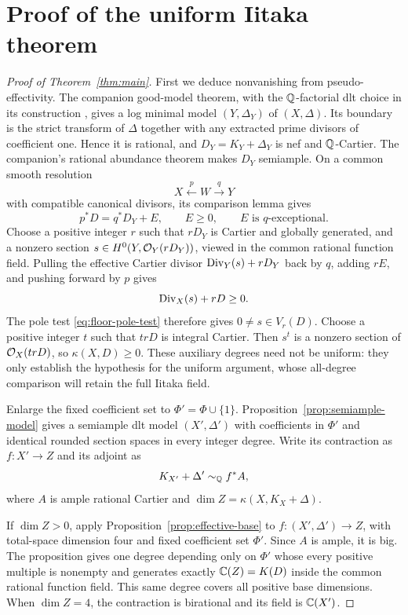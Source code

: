 \section{Proof of the uniform Iitaka theorem}
\label{sec:main-proof}

\begin{proof}[Proof of Theorem~\ref{thm:main}]
First we deduce nonvanishing from pseudo-effectivity. The companion
good-model theorem, with the \(\mathbb Q\)-factorial dlt choice in its
construction \cite[Theorem~11.1 and Proposition~2.5]{OpenAIAbundance},
gives a log minimal model \((Y,\Delta_Y)\) of \((X,\Delta)\).
Its boundary is the strict transform of \(\Delta\) together with any
extracted prime divisors of coefficient one. Hence it is rational,
and \(D_Y=K_Y+\Delta_Y\) is nef and \(\mathbb Q\)-Cartier. The companion's
rational abundance theorem \cite[Theorem~1.1]{OpenAIAbundance} makes
\(D_Y\) semiample. On a common smooth resolution
\[
 X\xleftarrow{p}W\xrightarrow{q}Y
\]
with compatible canonical divisors, its comparison lemma
\cite[Lemma~2.2]{OpenAIAbundance} gives
\[
 p^*D=q^*D_Y+E,\qquad E\geq0,\qquad E\text{ is }q\text{-exceptional}.
\]
Choose a positive integer \(r\) such that \(rD_Y\) is Cartier and
globally generated, and a nonzero section
\(s\in H^0(Y,\mathcal O_Y(rD_Y))\), viewed in the common rational function field.
Pulling the effective Cartier divisor
\(\operatorname{Div}_Y(s)+rD_Y\) back by \(q\), adding \(rE\), and pushing forward
by \(p\) gives
\[
 \operatorname{Div}_X(s)+rD\geq0.
\]
The pole test \eqref{eq:floor-pole-test} therefore gives
\(0\ne s\in V_r(D)\). Choose a positive integer \(t\) such that
\(trD\) is integral Cartier. Then \(s^t\) is a nonzero section of
\(\mathcal O_X(trD)\), so \(\kappa(X,D)\geq0\).
These auxiliary degrees need not be uniform: they only establish the
hypothesis for the uniform argument, whose all-degree comparison
will retain the full Iitaka field.

Enlarge the fixed coefficient set to $\Phi'=\Phi\cup\{1\}$.
Proposition~\ref{prop:semiample-model} gives a semiample dlt model
$(X',\Delta')$ with coefficients in $\Phi'$ and identical rounded
section spaces in every integer degree. Write its contraction as
$f:X'\to Z$ and its adjoint as
\[
 K_{X'}+\Delta'\sim_{\mathbb Q}f^*A,
\]
where $A$ is ample rational Cartier and
$\dim Z=\kappa(X,K_X+\Delta)$.

If $\dim Z>0$, apply Proposition~\ref{prop:effective-base} to
$f:(X',\Delta')\to Z$, with total-space dimension four and fixed
coefficient set $\Phi'$. Since $A$ is ample, it is big. The proposition
gives one degree depending only on $\Phi'$ whose every positive
multiple is nonempty and generates exactly $\mathbb C(Z)=K(D)$ inside the
common rational function field. This same degree covers all positive
base dimensions. When $\dim Z=4$, the contraction is birational and
its field is $\mathbb C(X')$.


\end{proof}
